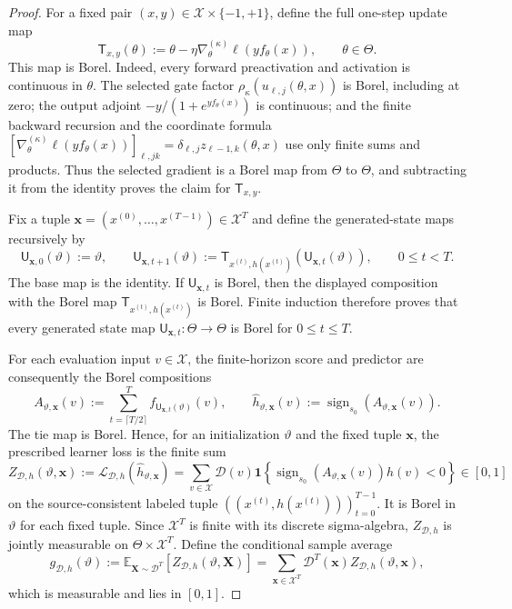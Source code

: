 \begin{proof}
For a fixed pair $(x,y)\in\mathcal X\times\{-1,+1\}$, define the full
one-step update map
\[
\mathsf T_{x,y}(\theta)
:=\theta-\eta\nabla_\theta^{(\kappa)}
\ell\!\left(yf_\theta(x)\right),
\qquad \theta\in\Theta.
\]
This map is Borel.  Indeed, every forward preactivation and activation is
continuous in $\theta$.  The selected gate factor
$\rho_\kappa(u_{\ell,j}(\theta,x))$ is Borel, including at zero; the output
adjoint $-y/(1+e^{yf_\theta(x)})$ is continuous; and the finite backward
recursion and the coordinate formula
$[\nabla_\theta^{(\kappa)}\ell(yf_\theta(x))]_{\ell,jk}
=\delta_{\ell,j}z_{\ell-1,k}(\theta,x)$ use only finite sums and products.
Thus the selected gradient is a Borel map from $\Theta$ to $\Theta$, and
subtracting it from the identity proves the claim for $\mathsf T_{x,y}$.

Fix a tuple
$\mathbf x=(x^{(0)},\ldots,x^{(T-1)})\in\mathcal X^T$ and define the
generated-state maps recursively by
\[
\mathsf U_{\mathbf x,0}(\vartheta):=\vartheta,
\qquad
\mathsf U_{\mathbf x,t+1}(\vartheta)
:=\mathsf T_{x^{(t)},h(x^{(t)})}
   (\mathsf U_{\mathbf x,t}(\vartheta)),
\qquad 0\leq t<T.
\]
The base map is the identity.  If $\mathsf U_{\mathbf x,t}$ is Borel, then
the displayed composition with the Borel map
$\mathsf T_{x^{(t)},h(x^{(t)})}$ is Borel.  Finite induction therefore proves
that every generated state map $\mathsf U_{\mathbf x,t}:\Theta\to\Theta$ is
Borel for $0\leq t\leq T$.

For each evaluation input $v\in\mathcal X$, the finite-horizon score and
predictor are consequently the Borel compositions
\[
A_{\vartheta,\mathbf x}(v)
:=\sum_{t=\lceil T/2\rceil}^{T}
f_{\mathsf U_{\mathbf x,t}(\vartheta)}(v),
\qquad
\widehat h_{\vartheta,\mathbf x}(v)
:=\operatorname{sign}_{s_0}(A_{\vartheta,\mathbf x}(v)).
\]
The tie map is Borel.  Hence, for an initialization $\vartheta$ and the fixed
tuple $\mathbf x$, the prescribed learner loss is the finite sum
\[
Z_{\mathcal D,h}(\vartheta,\mathbf x):=
\mathcal L_{\mathcal D,h}(\widehat h_{\vartheta,\mathbf x})
=\sum_{v\in\mathcal X}\mathcal D(v)
\mathbf1\!\left\{
\operatorname{sign}_{s_0}(A_{\vartheta,\mathbf x}(v))h(v)<0
\right\}\in[0,1]
\tag{85}\label{eq:p1-i3-eq085}
\]
on the source-consistent labeled tuple
$((x^{(t)},h(x^{(t)})))_{t=0}^{T-1}$.  It is Borel in $\vartheta$ for each
fixed tuple.  Since $\mathcal X^T$ is finite with its discrete sigma-algebra,
$Z_{\mathcal D,h}$ is jointly measurable on $\Theta\times\mathcal X^T$.
Define the conditional sample average
\[
g_{\mathcal D,h}(\vartheta):=
\mathbb E_{\mathbf X\sim\mathcal D^T}
[Z_{\mathcal D,h}(\vartheta,\mathbf X)]
=\sum_{\mathbf x\in\mathcal X^T}\mathcal D^T(\mathbf x)
Z_{\mathcal D,h}(\vartheta,\mathbf x),
\tag{86}\label{eq:p1-i3-eq086}
\]
which is measurable and lies in $[0,1]$.


\end{proof}

